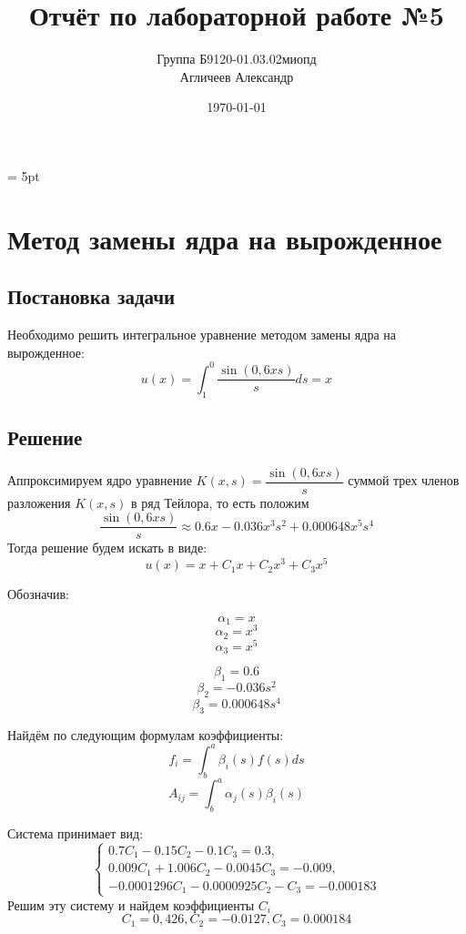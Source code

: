 \documentclass[a4paper, 14pt, fleqn]{extarticle}
\author {
	Группа Б9120-01.03.02миопд\\
	Агличеев Александр
}
\title {
	Отчёт по лабораторной работе №5
}
\date {
	\today
}
\begin{document}
	\maketitle
	\pagebreak
	\parskip = 5pt

	\section{Метод замены ядра на вырожденное}
		\subsection{Постановка задачи}
			\noindent Необходимо решить интегральное уравнение методом замены ядра на вырожденное:
			\begin{equation*}
				u(x) = \int_{1}^{0} \dfrac{\sin{(0,6xs)}}{s}ds = x
			\end{equation*}
	
		\subsection{Решение}
			Аппроксимируем ядро уравнение $K(x,s) = \dfrac{\sin{(0,6xs)}}{s}$ суммой трех членов разложения $K(x,s)$ в ряд Тейлора, то есть положим
			\[ \dfrac{\sin{(0,6xs)}}{s} \approx 0.6x - 0.036x^3s^2 + 0.000648x^5s^4 \]		
			Тогда решение будем искать в виде:
			\[ u(x) = x + C_1x + C_2x^3 + C_3x^5 \]
			
			Обозначив:
			
			\begin{minipage}{0.45\textwidth}
				\[ \alpha_1 = x \]
				\[ \alpha_2 = x^3 \]
				\[ \alpha_3 = x^5 \]
			\end{minipage}%
			\begin{minipage}{0.45\textwidth}
				\[ \beta_1 = 0.6 \]
				\[ \beta_2 = -0.036s^2 \]
				\[ \beta_3 = 0.000648s^4 \]  
			\end{minipage}%
			
			Найдём по следующим формулам коэффициенты:
			\[ f_i = \int_{b}^{a} \beta_i(s) f(s)ds \]
			\[ A_{ij} = \int_{b}^{a} \alpha_j(s) \beta_i(s) \]
		
			Система принимает вид:
			\[
				\begin{cases}
					0.7C_1 - 0.15C_2 - 0.1C_3 = 0.3,\\
					0.009C_1 + 1.006C_2 - 0.0045C_3 = -0.009, \\
					-0.0001296C_1 - 0.0000925C_2 - C_3 = -0.000183
				\end{cases}
			\]
			Решим эту систему и найдем коэффициенты $C_i$
			\[ C_1 = 0,426, C_2 = -0.0127, C_3 = 0.000184 \]
				
\end{document}
